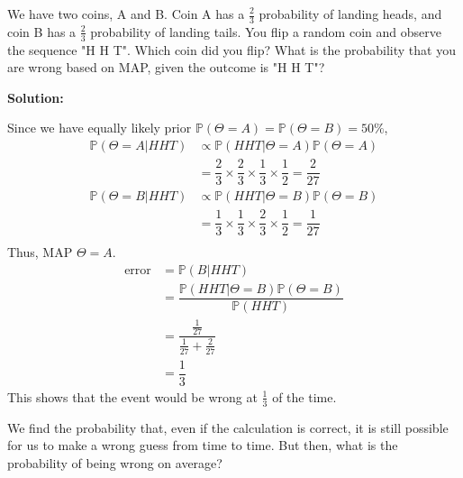\begin{eg}
  We have two coins, A and B. Coin A has a \(\frac{2}{3}\) probability of landing heads, and coin B has a \(\frac{2}{3}\) probability of landing tails. You flip a random coin and observe the sequence "H H T". Which coin did you flip? What is the probability that you are wrong based on MAP, given the outcome is "H H T"? 

  \textbf{Solution:} 

  Since we have equally likely prior \(\mathbb{P}(\Theta = A) = \mathbb{P}(\Theta = B) = 50\%\), 
  \[
    \begin{aligned}
      \mathbb{P}(\Theta = A \vert HHT) &\propto \mathbb{P}(HHT \vert \Theta = A)\mathbb{P}(\Theta = A) \\
      &= \dfrac{2}{3} \times \dfrac{2}{3} \times \dfrac{1}{3} \times \dfrac{1}{2} = \dfrac{2}{27} \\
      \mathbb{P}(\Theta = B \vert HHT) &\propto \mathbb{P}(HHT \vert \Theta = B)\mathbb{P}(\Theta = B) \\
      &= \dfrac{1}{3} \times \dfrac{1}{3} \times \dfrac{2}{3} \times \dfrac{1}{2} = \dfrac{1}{27} \\
    \end{aligned}
  \]
  Thus, MAP \(\Theta = A\). 
  \[
    \begin{aligned}
      \text{error} &= \mathbb{P}(B \vert HHT) \\
      &= \dfrac{\mathbb{P}(HHT \vert \Theta = B) \mathbb{P}(\Theta = B)}{\mathbb{P}(HHT)} \\
      &= \dfrac{\frac{1}{27}}{\frac{1}{27} + \frac{2}{27}} \\
      &= \dfrac{1}{3}
    \end{aligned}
  \]
  This shows that the event would be wrong at \(\frac{1}{3}\) of the time. 
\end{eg}

We find the probability that, even if the calculation is correct, it is still possible for us to make a wrong guess from time to time. But then, what is the probability of being wrong on average? 

